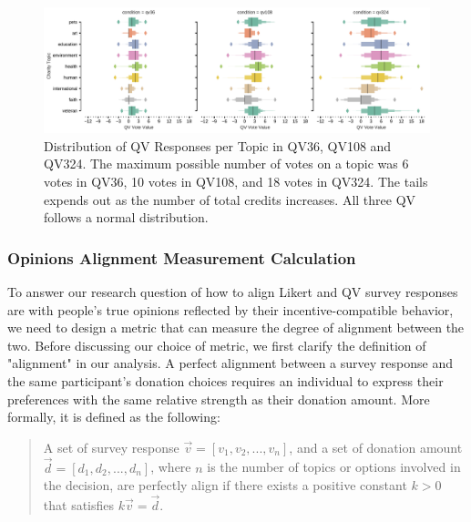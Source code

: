 \begin{figure}[htpb]
    \centering
    \includegraphics[width=\textwidth, keepaspectratio=true]{content/image/qv_distribution_per_topic.pdf}
    \caption{
      Distribution of QV Responses per Topic in QV36, QV108 and QV324. 
      The maximum possible number of votes on a topic was 6 votes in QV36, 10 votes in QV108, and 18 votes in QV324.
      The tails expends out as the number of total credits increases. 
      All three QV follows a normal distribution.
    }
    \label{fig:qv3_exp1}
\end{figure}


\subsubsection{Opinions Alignment Measurement Calculation}

To answer our research question 
of how to align Likert and QV survey responses are 
with people's true opinions 
reflected by their incentive-compatible behavior, %
we need to design a metric 
that can measure the degree of alignment 
between the two. 
Before discussing our choice of metric, 
we first clarify the definition of "alignment" in our analysis. 
A perfect alignment 
between a survey response 
and the same participant's donation choices
requires an individual to express their preferences
with the same relative strength as their donation amount. 
More formally, it is defined as the following:\par

\begin{quote}
    A set of survey response $\vec{v} = [v_1, v_2, ..., v_n]$, 
    and a set of donation amount $\vec{d} = [d_1, d_2, ..., d_n]$, 
    where $n$ is the number of topics or options involved in the decision, 
    are perfectly align if there exists a positive constant $k>0$ that satisfies $k\vec{v} = \vec{d}$.
\end{quote}

